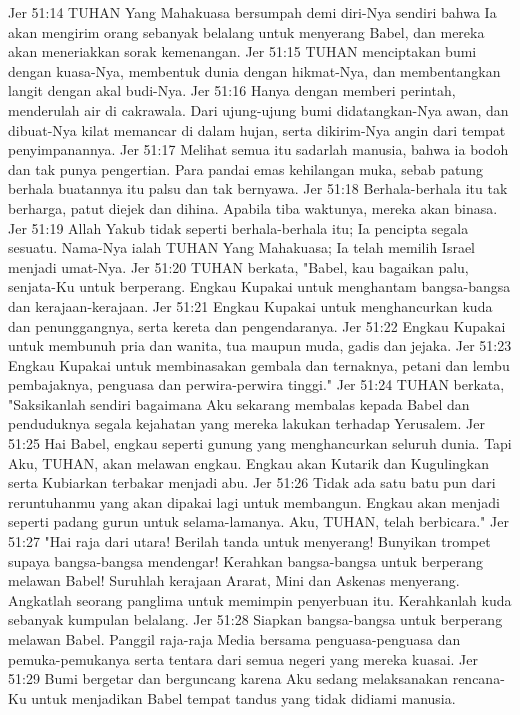 Jer 51:14  TUHAN Yang Mahakuasa bersumpah demi diri-Nya sendiri bahwa Ia akan mengirim orang sebanyak belalang untuk menyerang Babel, dan mereka akan meneriakkan sorak kemenangan.
Jer 51:15  TUHAN menciptakan bumi dengan kuasa-Nya, membentuk dunia dengan hikmat-Nya, dan membentangkan langit dengan akal budi-Nya.
Jer 51:16  Hanya dengan memberi perintah, menderulah air di cakrawala. Dari ujung-ujung bumi didatangkan-Nya awan, dan dibuat-Nya kilat memancar di dalam hujan, serta dikirim-Nya angin dari tempat penyimpanannya.
Jer 51:17  Melihat semua itu sadarlah manusia, bahwa ia bodoh dan tak punya pengertian. Para pandai emas kehilangan muka, sebab patung berhala buatannya itu palsu dan tak bernyawa.
Jer 51:18  Berhala-berhala itu tak berharga, patut diejek dan dihina. Apabila tiba waktunya, mereka akan binasa.
Jer 51:19  Allah Yakub tidak seperti berhala-berhala itu; Ia pencipta segala sesuatu. Nama-Nya ialah TUHAN Yang Mahakuasa; Ia telah memilih Israel menjadi umat-Nya.
Jer 51:20  TUHAN berkata, "Babel, kau bagaikan palu, senjata-Ku untuk berperang. Engkau Kupakai untuk menghantam bangsa-bangsa dan kerajaan-kerajaan.
Jer 51:21  Engkau Kupakai untuk menghancurkan kuda dan penunggangnya, serta kereta dan pengendaranya.
Jer 51:22  Engkau Kupakai untuk membunuh pria dan wanita, tua maupun muda, gadis dan jejaka.
Jer 51:23  Engkau Kupakai untuk membinasakan gembala dan ternaknya, petani dan lembu pembajaknya, penguasa dan perwira-perwira tinggi."
Jer 51:24  TUHAN berkata, "Saksikanlah sendiri bagaimana Aku sekarang membalas kepada Babel dan penduduknya segala kejahatan yang mereka lakukan terhadap Yerusalem.
Jer 51:25  Hai Babel, engkau seperti gunung yang menghancurkan seluruh dunia. Tapi Aku, TUHAN, akan melawan engkau. Engkau akan Kutarik dan Kugulingkan serta Kubiarkan terbakar menjadi abu.
Jer 51:26  Tidak ada satu batu pun dari reruntuhanmu yang akan dipakai lagi untuk membangun. Engkau akan menjadi seperti padang gurun untuk selama-lamanya. Aku, TUHAN, telah berbicara."
Jer 51:27  "Hai raja dari utara! Berilah tanda untuk menyerang! Bunyikan trompet supaya bangsa-bangsa mendengar! Kerahkan bangsa-bangsa untuk berperang melawan Babel! Suruhlah kerajaan Ararat, Mini dan Askenas menyerang. Angkatlah seorang panglima untuk memimpin penyerbuan itu. Kerahkanlah kuda sebanyak kumpulan belalang.
Jer 51:28  Siapkan bangsa-bangsa untuk berperang melawan Babel. Panggil raja-raja Media bersama penguasa-penguasa dan pemuka-pemukanya serta tentara dari semua negeri yang mereka kuasai.
Jer 51:29  Bumi bergetar dan berguncang karena Aku sedang melaksanakan rencana-Ku untuk menjadikan Babel tempat tandus yang tidak didiami manusia.
